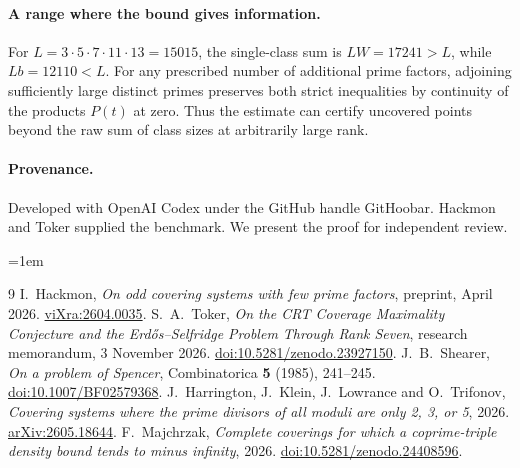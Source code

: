 \documentclass[11pt]{article}
\begin{document}
\paragraph{A range where the bound gives information.}
For \(L=3\cdot5\cdot7\cdot11\cdot13=15015\), the single-class sum is
\(LW=17241>L\), while \(Lb=12110<L\).
For any prescribed number of additional prime factors, adjoining
sufficiently large distinct primes preserves both strict inequalities by
continuity of the products \(P(t)\) at zero. Thus the estimate can certify
uncovered points beyond the raw sum of class sizes at arbitrarily large rank.

\paragraph{Provenance.}
Developed with OpenAI Codex under the GitHub handle GitHoobar.
Hackmon and Toker supplied the benchmark. We present the proof for
independent review.

\small
\emergencystretch=1em
\begin{thebibliography}{9}
\setlength{\itemsep}{1pt}
 I.~Hackmon, \emph{On odd covering systems with few prime
factors}, preprint, April 2026. \href{https://rxiv.org/abs/2604.0035}{viXra:2604.0035}.
 S.~A.~Toker, \emph{On the CRT Coverage Maximality Conjecture
and the Erd\H{o}s--Selfridge Problem Through Rank Seven}, research memorandum,
3 November 2026. \href{https://doi.org/10.5281/zenodo.23927150}{doi:10.5281/zenodo.23927150}.
 J.~B.~Shearer, \emph{On a problem of Spencer},
Combinatorica \textbf{5} (1985), 241--245.
\href{https://doi.org/10.1007/BF02579368}{doi:10.1007/BF02579368}.
 J.~Harrington, J.~Klein, J.~Lowrance and O.~Trifonov,
\emph{Covering systems where the prime divisors of all moduli are only 2, 3, or 5},
2026. \href{https://arxiv.org/abs/2605.18644}{arXiv:2605.18644}.
 F.~Majchrzak, \emph{Complete coverings for which a coprime-triple
density bound tends to minus infinity}, 2026.
\href{https://doi.org/10.5281/zenodo.24408596}{doi:10.5281/zenodo.24408596}.
\end{thebibliography}
\end{document}
